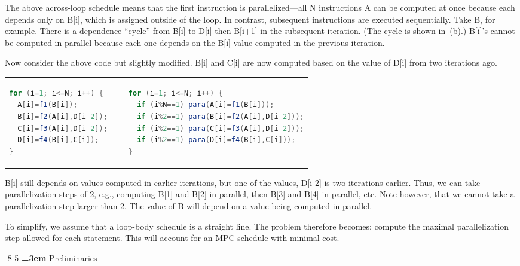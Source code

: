 \documentclass[sigconf, screen, natbib=false, dvipsnames, table]{acmart}
\makeatletter
\renewcommand{\subsection}{\@startsection{subsection}{2}{\z@}%
                        {-8\p@ \@plus -4\p@ \@minus -4\p@}%
                        {5\p@ \@plus 2\p@ \@minus 2\p@}%
                        {\normalfont\Large\bfseries\boldmath
                         \rightskip=\z@ \@plus 3em\pretolerance=10000 }}
\theoremstyle{definition}
\makeatother
\begin{document}
The above across-loop schedule means that the first instruction is parallelized---all
N instructions A can be computed at once because each depends only on {\sf B[i]}, which
is assigned outside of the loop. In contrast, subsequent instructions are executed 
sequentially. Take B, for example. There is a dependence ``cycle'' from {\sf B[i]} 
to {\sf D[i]} then {\sf B[i+1]} in the subsequent iteration. (The cycle is shown in~(b).) 
{\sf B[i]}'s cannot be computed in parallel because each one depends on the {\sf B[i]} 
value computed in the previous iteration.

Now consider the above code but slightly modified. {\sf B[i]} and {\sf C[i]} are now 
computed based on the value of {\sf D[i]} from two iterations ago.

\begin{tabular}{lll}
\begin{lstlisting}[language=Java]
for (i=1; i<=N; i++) {
  A[i]=f1(B[i]);
  B[i]=f2(A[i],D[i-2]);
  C[i]=f3(A[i],D[i-2]);
  D[i]=f4(B[i],C[i]);
}	

\end{lstlisting}
& 
~
&
\begin{lstlisting}[language=Java]
for (i=1; i<=N; i++) {
  if (i%N==1) para(A[i]=f1(B[i]));
  if (i%2==1) para(B[i]=f2(A[i],D[i-2]));
  if (i%2==1) para(C[i]=f3(A[i],D[i-2]));
  if (i%2==1) para(D[i]=f4(B[i],C[i]));
}	
\end{lstlisting}

\end{tabular}

{\sf B[i]} still depends on values computed in earlier iterations, but one of the values, D[i-2] 
is two iterations earlier. Thus, we can take parallelization steps of 2, e.g., computing 
{\sf B[1]} and {\sf B[2]} in parallel, then {\sf B[3]} and {\sf B[4]} in parallel, etc.
Note however, that we cannot take a parallelization step larger than 2.
The value of B will depend on a value being computed in parallel.

To simplify, we assume that a loop-body schedule is a straight line. 
The problem therefore becomes: compute the maximal parallelization 
step allowed for each statement. This will account for an MPC schedule with
minimal cost. 

\subsection{Preliminaries}
\end{document}

